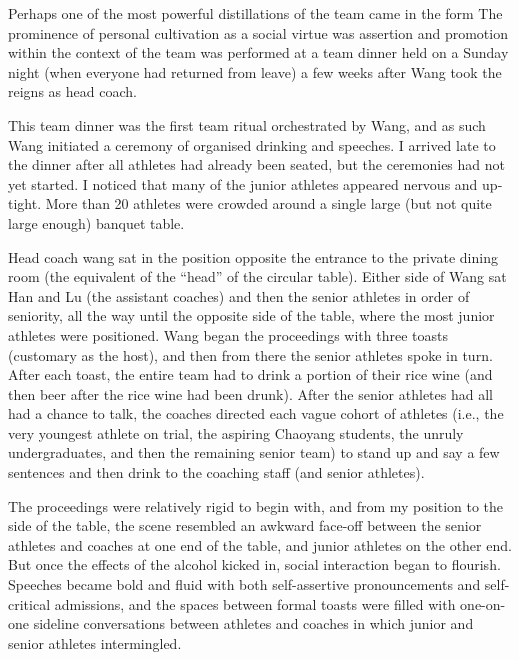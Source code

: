 \begin{CJK}{UTF8}{gbsn}
Perhaps one of the most powerful distillations of the team came in the form The prominence of personal cultivation as a social virtue was assertion and promotion within the context of the team was performed at a team dinner held on a Sunday night (when everyone had returned from leave) a few weeks after Wang took the reigns as head coach.

This team dinner was the first team ritual orchestrated by Wang, and as such Wang initiated a ceremony of organised drinking and speeches.  I arrived late to the dinner after all athletes had already been seated, but the ceremonies had not yet started.  I noticed that many of the junior athletes appeared nervous and up-tight. More than 20 athletes were crowded around a single large (but not quite large enough) banquet table.

Head coach wang sat in the position opposite the entrance to the private dining room (the equivalent of the ``head'' of the circular table).  Either side of Wang sat Han and Lu (the assistant coaches) and then the senior athletes in order of seniority, all the way until the opposite side of the table, where the most junior athletes were positioned.  Wang began the proceedings with three toasts (customary as the host), and then from there the senior athletes spoke in turn.  After each toast, the entire team had to drink a portion of their rice wine (and then beer after the rice wine had been drunk).  After the senior athletes had all had a chance to talk, the coaches directed each vague cohort of athletes (i.e., the very youngest athlete on trial, the aspiring Chaoyang students, the unruly undergraduates, and then the remaining senior team) to stand up and say a few sentences and then drink to the coaching staff (and senior athletes).

The proceedings were relatively rigid to begin with, and from my position to the side of the table, the scene resembled an awkward face-off between the senior athletes and coaches at one end of the table, and junior athletes on the other end.  But once the effects of the alcohol kicked in, social interaction began to flourish. Speeches became bold and fluid with both self-assertive pronouncements and self-critical admissions, and the spaces between formal toasts were filled with one-on-one sideline conversations between athletes and coaches in which junior and senior athletes intermingled.


\end{CJK}
